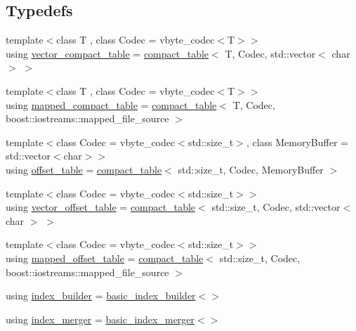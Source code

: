 \subsection*{Typedefs}
\begin{DoxyCompactItemize}
\item 
{\footnotesize template$<$class T , class Codec  = vbyte\+\_\+codec$<$\+T$>$$>$ }\\using \mbox{\hyperlink{namespaceirk_a34b2e9b780a3b5d4532d7975d6c1a8bf}{vector\+\_\+compact\+\_\+table}} = \mbox{\hyperlink{classirk_1_1compact__table}{compact\+\_\+table}}$<$ T, Codec, std\+::vector$<$ char $>$ $>$
\item 
{\footnotesize template$<$class T , class Codec  = vbyte\+\_\+codec$<$\+T$>$$>$ }\\using \mbox{\hyperlink{namespaceirk_a355b82a658f8685da29eca82444fed3c}{mapped\+\_\+compact\+\_\+table}} = \mbox{\hyperlink{classirk_1_1compact__table}{compact\+\_\+table}}$<$ T, Codec, boost\+::iostreams\+::mapped\+\_\+file\+\_\+source $>$
\item 
{\footnotesize template$<$class Codec  = vbyte\+\_\+codec$<$std\+::size\+\_\+t$>$, class Memory\+Buffer  = std\+::vector$<$char$>$$>$ }\\using \mbox{\hyperlink{namespaceirk_a3d7b00f359d122e0bf0f709d21f00098}{offset\+\_\+table}} = \mbox{\hyperlink{classirk_1_1compact__table}{compact\+\_\+table}}$<$ std\+::size\+\_\+t, Codec, Memory\+Buffer $>$
\item 
{\footnotesize template$<$class Codec  = vbyte\+\_\+codec$<$std\+::size\+\_\+t$>$$>$ }\\using \mbox{\hyperlink{namespaceirk_a6d042444ebc87e3036291ec5656b0c51}{vector\+\_\+offset\+\_\+table}} = \mbox{\hyperlink{classirk_1_1compact__table}{compact\+\_\+table}}$<$ std\+::size\+\_\+t, Codec, std\+::vector$<$ char $>$ $>$
\item 
{\footnotesize template$<$class Codec  = vbyte\+\_\+codec$<$std\+::size\+\_\+t$>$$>$ }\\using \mbox{\hyperlink{namespaceirk_ab3084e78181e92fe4bea7332e0a77e98}{mapped\+\_\+offset\+\_\+table}} = \mbox{\hyperlink{classirk_1_1compact__table}{compact\+\_\+table}}$<$ std\+::size\+\_\+t, Codec, boost\+::iostreams\+::mapped\+\_\+file\+\_\+source $>$
\item 
using \mbox{\hyperlink{namespaceirk_a5d414f06e9be9b0e06236aa7fd41130b}{index\+\_\+builder}} = \mbox{\hyperlink{classirk_1_1basic__index__builder}{basic\+\_\+index\+\_\+builder}}$<$$>$
\item 
using \mbox{\hyperlink{namespaceirk_abf02801860e10848db8a39845005f0c4}{index\+\_\+merger}} = \mbox{\hyperlink{classirk_1_1basic__index__merger}{basic\+\_\+index\+\_\+merger}}$<$$>$

\end{DoxyCompactItemize}
